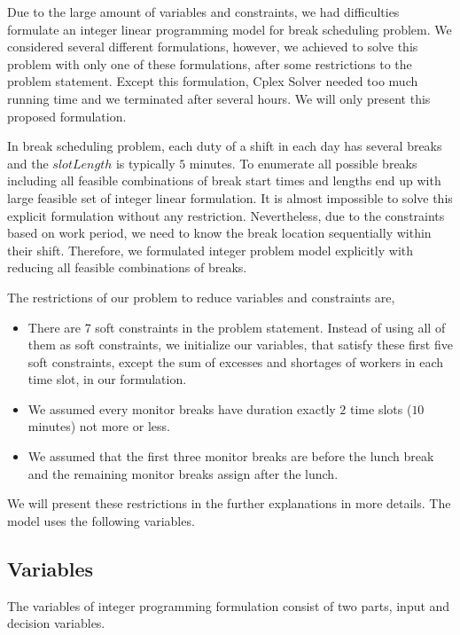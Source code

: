 Due to the large amount of variables and constraints, we had difficulties formulate an integer linear programming model  for break scheduling problem. We considered several different formulations, however, we achieved to solve this problem with only one of these formulations, after some restrictions to the problem statement. Except this formulation, Cplex Solver needed too much running time and we terminated after several hours. We will only present this proposed formulation.

In break scheduling problem, each duty of a shift in each day has several breaks and the $slotLength$ is typically $5$ minutes. To enumerate all possible breaks including all feasible combinations of break start times and lengths end up with large feasible set of integer linear formulation. It is almost impossible to solve this explicit formulation without any restriction. Nevertheless, due to the constraints based on work period, we need to know the break location sequentially within their shift. Therefore, we formulated integer problem model explicitly with reducing all feasible combinations of breaks.

The restrictions of our problem to reduce variables and constraints are,

\begin{itemize}

\item There are 7 soft constraints in the problem statement. Instead of using all of them as soft constraints, we initialize our variables, that satisfy these first five soft constraints, except the sum of excesses and shortages of workers in each time slot, in our formulation.

\item We assumed every monitor breaks have duration exactly $2$ time slots ($10$ minutes) not more or less. 

\item We assumed that the first three monitor breaks are before the lunch break and the remaining monitor breaks assign after the lunch. 
\end{itemize}

We will present these restrictions in the further explanations in more details. The model uses the following variables.

\subsection{Variables}

The variables of integer programming formulation consist of two parts, input and decision variables.

